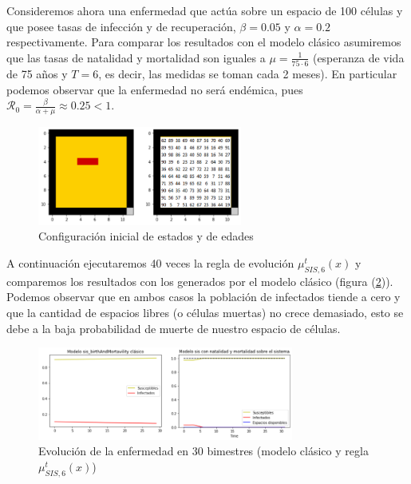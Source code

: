 \begin{example}\label{ex:sisClásicovsModeloEnAC}
Consideremos ahora una enfermedad que actúa sobre un espacio de 100 células y que posee tasas de infección y de recuperación, $\beta=0.05$ y $\alpha=0.2$ respectivamente. Para comparar los resultados con el modelo clásico asumiremos que las tasas de natalidad y mortalidad son iguales a $\mu=\frac{1}{75\cdot6}$ (esperanza de vida de 75 años y $T=6$, es decir, las medidas se toman cada 2 meses). En particular podemos observar que la enfermedad no será endémica, pues $\mathcal{R}_0=\frac{\beta}{\alpha+\mu}\approx0.25<1$.

\begin{figure}[h]
  \centering
    \includegraphics[width=0.6\textwidth]{Imagenes/sistemaYEdades.PNG}
    \caption{Configuración inicial de estados y de edades}
    \label{ex:aplicaciónReglaNatalidadyMortalidad}
\end{figure}

A continuación ejecutaremos 40 veces la regla de evolución $\mu_{SIS,6}^t(x)$ y comparemos los resultados con los generados por el modelo clásico (figura (\ref{ex:aplicaciónReglaNatalidadyMortalidad})). Podemos observar que en ambos casos la población de infectados tiende a cero y que la cantidad de espacios libres (o células muertas) no crece demasiado, esto se debe a la baja probabilidad de muerte de nuestro espacio de células.

\begin{figure}[h]
  \centering
    \includegraphics[width=0.75\textwidth]{Imagenes/solucionesNatalidadYMortalidad.PNG}
    \caption{Evolución de la enfermedad en 30 bimestres (modelo clásico y regla $\mu_{SIS,6}^t(x)$)}
    \label{ex:aplicaciónReglaNatalidadyMortalidad}
\end{figure}
\end{example}

